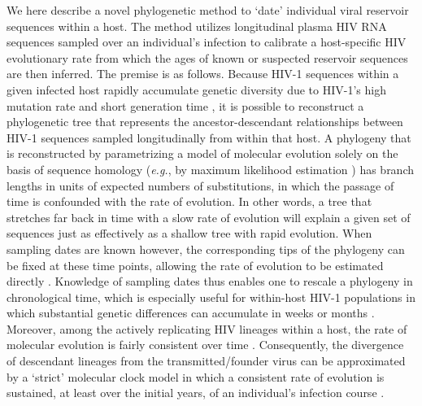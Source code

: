 \documentclass{bmcart}
\begin{document}
We here describe a novel phylogenetic method to `date' individual viral reservoir sequences within a host.
The method utilizes longitudinal plasma HIV RNA sequences sampled over an individual's infection to calibrate a host-specific HIV evolutionary rate from which the ages of known or suspected reservoir sequences are then inferred. The premise is as follows.
Because HIV-1 sequences within a given infected host rapidly accumulate genetic diversity due to HIV-1's high mutation rate and short generation time \cite{Alizon13,Rambaut04,Shankarappa99}, it is possible to reconstruct a phylogenetic tree that represents the ancestor-descendant relationships between HIV-1 sequences sampled longitudinally from within that host.
A phylogeny that is reconstructed by parametrizing a model of molecular evolution solely on the basis of sequence homology (\emph{e.g.}, by maximum likelihood estimation \cite{Felsenstein81}) has branch lengths in units of expected numbers of substitutions, in which the passage of time is confounded with the rate of evolution.
In other words, a tree that stretches far back in time with a slow rate of evolution will explain a given set of sequences just as effectively as a shallow tree with rapid evolution.
When sampling dates are known however, the corresponding tips of the phylogeny can be fixed at these time points, allowing the rate of evolution to be estimated directly \cite{Rodrigo99}.
Knowledge of sampling dates thus enables one to rescale a phylogeny in chronological time, which is especially useful for within-host HIV-1 populations in which substantial genetic differences can accumulate in weeks or months \cite{Williamson03}.
Moreover, among the actively replicating HIV lineages within a host, the rate of molecular evolution is fairly consistent over time \cite{Korber00,Kuhner95,Leitner99,Park16}.
Consequently, the divergence of descendant lineages from the transmitted/founder virus can be approximated by a `strict' molecular clock model in which a consistent rate of evolution is sustained, at least over the initial years, of an individual's infection course \cite{Keele08}. 
\end{document}
